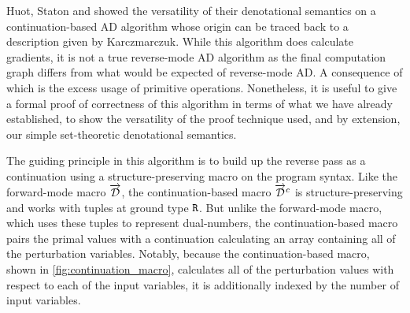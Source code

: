  Huot, Staton and \Vakar{} showed the versatility of their denotational semantics on a continuation-based AD algorithm whose origin can be traced back to a description given by Karczmarczuk\cite{KarczmarczukLazyTimeReversal}.
  While this algorithm does calculate gradients, it is not a true reverse-mode AD algorithm as the final computation graph differs from what would be expected of reverse-mode AD\cite{PearlmutterSiskind2008}.
  A consequence of which is the excess usage of primitive operations.
  Nonetheless, it is useful to give a formal proof of correctness of this algorithm in terms of what we have already established, to show the versatility of the proof technique used, and by extension, our simple set-theoretic denotational semantics.

  The guiding principle in this algorithm is to build up the reverse pass as a continuation using a structure-preserving macro on the program syntax.
  Like the forward-mode macro $\overrightarrow{\mathcal{D}}$, the continuation-based macro $\overrightarrow{\mathcal{D}}^c$ is structure-preserving and works with tuples at ground type $\texttt{R}$.
  But unlike the forward-mode macro, which uses these tuples to represent dual-numbers, the continuation-based macro pairs the primal values with a continuation calculating an array containing all of the perturbation variables.
  Notably, because the continuation-based macro, shown in \cref{fig:continuation_macro}, calculates all of the perturbation values with respect to each of the input variables, it is additionally indexed by the number of input variables.

